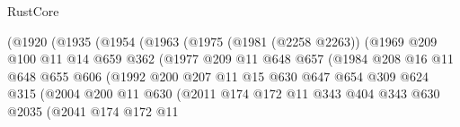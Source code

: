 \begin{lexlean}{RustCore}
\begin{coremodule}
                            (@1920
                              (@1935
                                (@1954
                                  (@1963
                                    (@1975
                                      (@1981 (@2258 @2263))
                                      (@1969
                                        @209
                                        @100
                                        @11
                                        @14
                                        @659
                                        @362
                                        (@1977
                                          @209
                                          @11
                                          @648
                                          @657
                                          (@1984
                                            @208
                                            @16
                                            @11
                                            @648
                                            @655
                                            @606
                                            (@1992
                                              @200
                                              @207
                                              @11
                                              @15
                                              @630
                                              @647
                                              @654
                                              @309
                                              @624
                                              @315
                                              (@2004
                                                @200
                                                @11
                                                @630
                                                (@2011
                                                  @174
                                                  @172
                                                  @11
                                                  @343
                                                  @404
                                                  @343
                                                  @630
                                                  @2035
                                                  (@2041
                                                    @174
                                                    @172
                                                    @11

\end{coremodule}
\end{lexlean}
